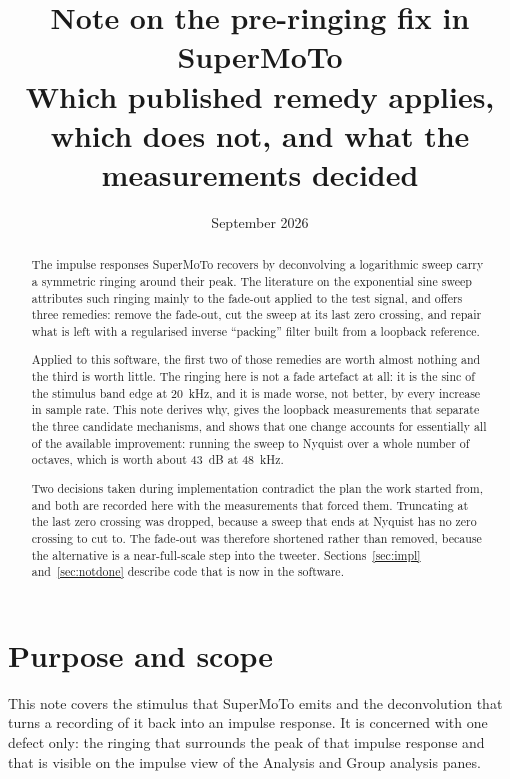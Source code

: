 \documentclass[11pt,a4paper]{article}
\title{\bfseries Note on the pre-ringing fix in SuperMoTo\\
       \large Which published remedy applies, which does not, and what the
       measurements decided}
\author{}
\date{September 2026}
\begin{document}
\maketitle
\thispagestyle{fancy}

\begin{abstract}
\noindent
The impulse responses SuperMoTo recovers by deconvolving a logarithmic sweep
carry a symmetric ringing around their peak. The literature on the exponential
sine sweep attributes such ringing mainly to the fade-out applied to the test
signal, and offers three remedies: remove the fade-out, cut the sweep at its
last zero crossing, and repair what is left with a regularised inverse
``packing'' filter built from a loopback reference.

Applied to this software, the first two of those remedies are worth almost
nothing and the third is worth little. The ringing here is not a fade artefact
at all: it is the sinc of the stimulus band edge at \SI{20}{\kilo\hertz}, and it
is made worse, not better, by every increase in sample rate. This note derives
why, gives the loopback measurements that separate the three candidate
mechanisms, and shows that one change accounts for essentially all of the
available improvement: running the sweep to Nyquist over a whole number of
octaves, which is worth about \SI{43}{\dB} at \SI{48}{\kilo\hertz}.

Two decisions taken during implementation contradict the plan the work started
from, and both are recorded here with the measurements that forced them.
Truncating at the last zero crossing was dropped, because a sweep that ends at
Nyquist has no zero crossing to cut to. The fade-out was therefore shortened
rather than removed, because the alternative is a near-full-scale step into the
tweeter. Sections~\ref{sec:impl} and~\ref{sec:notdone} describe code that is now
in the software.
\end{abstract}

\tableofcontents
\bigskip

\section{Purpose and scope}

This note covers the stimulus that SuperMoTo emits and the deconvolution that
turns a recording of it back into an impulse response. It is concerned with one
defect only: the ringing that surrounds the peak of that impulse response and
that is visible on the impulse view of the Analysis and Group analysis panes.
\end{document}
